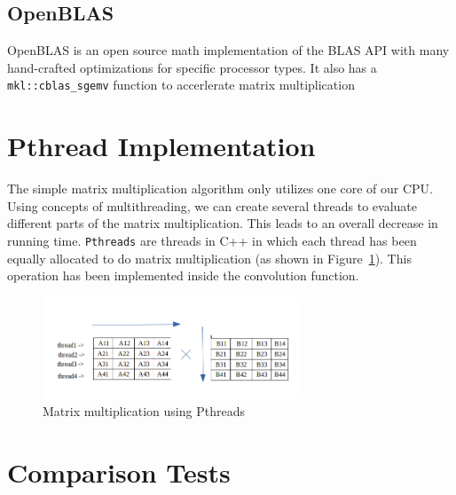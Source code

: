 \documentclass{article}
\begin{document}
\subsection{OpenBLAS}

OpenBLAS \cite{OpenBLAS} is an open source math implementation of the BLAS API with many hand-crafted optimizations for specific processor types. It also has a \verb!mkl::cblas_sgemv! function to accerlerate matrix multiplication

\section{Pthread Implementation}
The simple matrix multiplication algorithm only utilizes one core of our CPU. Using concepts of multithreading, we can create several threads to evaluate different parts of the matrix multiplication. This leads to an overall decrease in running time. \verb!Pthreads! are threads in C++ in which each thread has been equally allocated to do matrix multiplication (as shown in Figure~\ref{pthread}). This operation has been  implemented inside the convolution function. 

\begin{figure}[h]
\centering
\includegraphics[width=3in]{matmul.png} 

\caption{Matrix multiplication using Pthreads \cite{pthreadwebsite}}
\label{pthread}
\end{figure}


 \pagebreak

\section{Comparison Tests}
\end{document}
